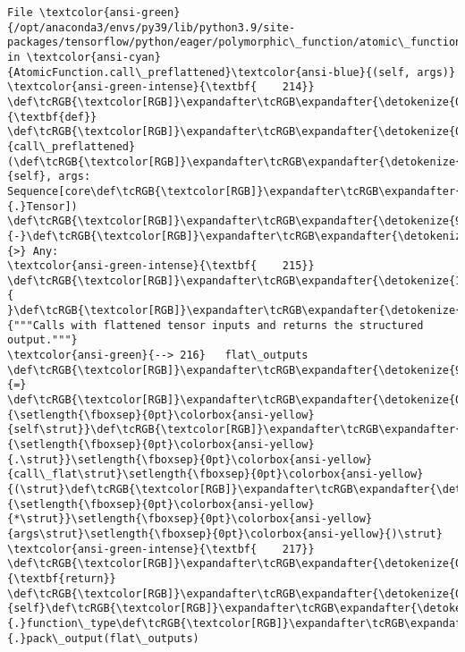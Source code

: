 \documentclass[11pt]{article}
\begin{document}
\begin{Verbatim}[commandchars=\\\{\}, frame=single, framerule=2mm, rulecolor=\color{outerrorbackground}]
File \textcolor{ansi-green}{/opt/anaconda3/envs/py39/lib/python3.9/site-packages/tensorflow/python/eager/polymorphic\_function/atomic\_function.py:216}, in \textcolor{ansi-cyan}{AtomicFunction.call\_preflattened}\textcolor{ansi-blue}{(self, args)}
\textcolor{ansi-green-intense}{\textbf{    214}} \def\tcRGB{\textcolor[RGB]}\expandafter\tcRGB\expandafter{\detokenize{0,135,0}}{\textbf{def}} \def\tcRGB{\textcolor[RGB]}\expandafter\tcRGB\expandafter{\detokenize{0,0,255}}{call\_preflattened}(\def\tcRGB{\textcolor[RGB]}\expandafter\tcRGB\expandafter{\detokenize{0,135,0}}{self}, args: Sequence[core\def\tcRGB{\textcolor[RGB]}\expandafter\tcRGB\expandafter{\detokenize{98,98,98}}{.}Tensor]) \def\tcRGB{\textcolor[RGB]}\expandafter\tcRGB\expandafter{\detokenize{98,98,98}}{-}\def\tcRGB{\textcolor[RGB]}\expandafter\tcRGB\expandafter{\detokenize{98,98,98}}{>} Any:
\textcolor{ansi-green-intense}{\textbf{    215}} \def\tcRGB{\textcolor[RGB]}\expandafter\tcRGB\expandafter{\detokenize{188,188,188}}{  }\def\tcRGB{\textcolor[RGB]}\expandafter\tcRGB\expandafter{\detokenize{175,0,0}}{"""Calls with flattened tensor inputs and returns the structured output."""}
\textcolor{ansi-green}{--> 216}   flat\_outputs \def\tcRGB{\textcolor[RGB]}\expandafter\tcRGB\expandafter{\detokenize{98,98,98}}{=} \def\tcRGB{\textcolor[RGB]}\expandafter\tcRGB\expandafter{\detokenize{0,135,0}}{\setlength{\fboxsep}{0pt}\colorbox{ansi-yellow}{self\strut}}\def\tcRGB{\textcolor[RGB]}\expandafter\tcRGB\expandafter{\detokenize{98,98,98}}{\setlength{\fboxsep}{0pt}\colorbox{ansi-yellow}{.\strut}}\setlength{\fboxsep}{0pt}\colorbox{ansi-yellow}{call\_flat\strut}\setlength{\fboxsep}{0pt}\colorbox{ansi-yellow}{(\strut}\def\tcRGB{\textcolor[RGB]}\expandafter\tcRGB\expandafter{\detokenize{98,98,98}}{\setlength{\fboxsep}{0pt}\colorbox{ansi-yellow}{*\strut}}\setlength{\fboxsep}{0pt}\colorbox{ansi-yellow}{args\strut}\setlength{\fboxsep}{0pt}\colorbox{ansi-yellow}{)\strut}
\textcolor{ansi-green-intense}{\textbf{    217}}   \def\tcRGB{\textcolor[RGB]}\expandafter\tcRGB\expandafter{\detokenize{0,135,0}}{\textbf{return}} \def\tcRGB{\textcolor[RGB]}\expandafter\tcRGB\expandafter{\detokenize{0,135,0}}{self}\def\tcRGB{\textcolor[RGB]}\expandafter\tcRGB\expandafter{\detokenize{98,98,98}}{.}function\_type\def\tcRGB{\textcolor[RGB]}\expandafter\tcRGB\expandafter{\detokenize{98,98,98}}{.}pack\_output(flat\_outputs)


\end{Verbatim}
\end{document}
